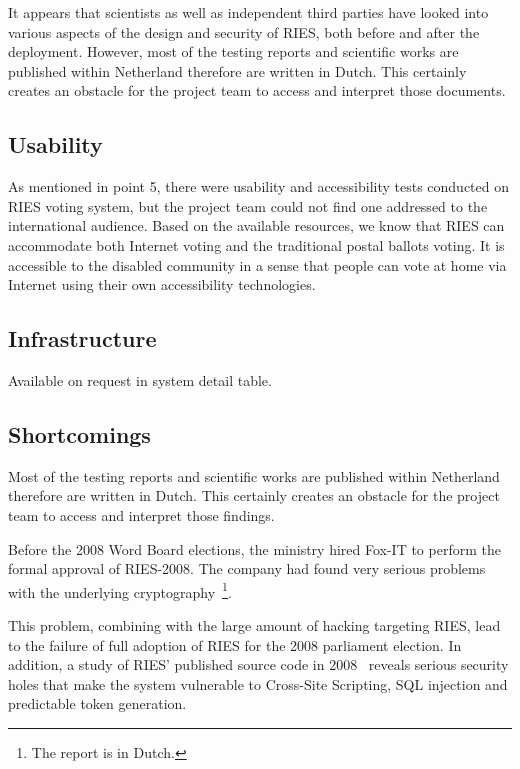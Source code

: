 It appears that scientists as well as independent third parties have
looked into various aspects of the design and security of RIES, both
before and after the deployment. However, most of the testing reports
and scientific works are published within Netherland therefore are
written in Dutch. This certainly creates an obstacle for the project
team to access and interpret those documents.

\subsection{Usability}

As mentioned in point 5, there were usability and accessibility tests
conducted on RIES voting system, but the project team could not find
one addressed to the international audience. Based on the available
resources, we know that RIES can accommodate both Internet voting and
the traditional postal ballots voting. It is accessible to the
disabled community in a sense that people can vote at home via
Internet using their own accessibility technologies.

\subsection{Infrastructure}

Available on request in system detail table.

\subsection{Shortcomings}

Most of the testing reports and scientific works are published within
Netherland therefore are written in Dutch. This certainly creates an
obstacle for the project team to access and interpret those findings.

Before the 2008 Word Board elections, the ministry hired Fox-IT to
perform the formal approval of RIES-2008. The company had found very
serious problems with the underlying
cryptography~\cite{gedrojc2008}\footnote{The report is in
  Dutch.}. \cite[p3]{gonggrijp2009}

This problem, combining with the large amount of hacking targeting
RIES, lead to the failure of full adoption of RIES for the 2008
parliament election. In addition, a study of RIES' published source
code in 2008~\cite{gonggrijp2009} reveals serious security holes that
make the system vulnerable to Cross-Site Scripting, SQL injection and
predictable token generation.

